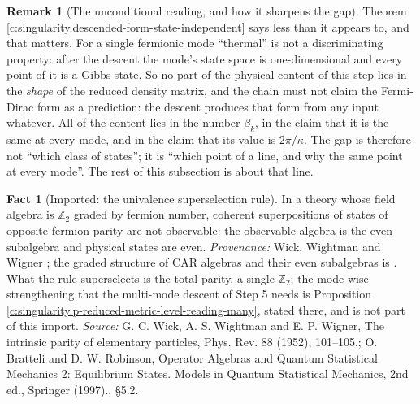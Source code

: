 \documentclass[11pt]{article}
\theoremstyle{definition}
\newtheorem{fact}[theorem]{Fact}
\newtheorem{remark}[theorem]{Remark}
\theoremstyle{plain}
\begin{document}
\begin{remark}[The unconditional reading, and how it sharpens the gap]\label{c:note.singularity.unconditional-reading-how-it-sharpens-gap}
Theorem \ref{c:singularity.descended-form-state-independent} says less than it appears to, and that matters. For a single fermionic mode ``thermal'' is not a discriminating property: after the descent the mode's state space is one-dimensional and every point of it is a Gibbs state. So no part of the physical content of this step lies in the \emph{shape} of the reduced density matrix, and the chain must not claim the Fermi-Dirac form as a prediction: the descent produces that form from any input whatever. All of the content lies in the number $\beta_k$, in the claim that it is the same at every mode, and in the claim that its value is $2\pi/\kappa$. The gap is therefore not ``which class of states''; it is ``which point of a line, and why the same point at every mode''. The rest of this subsection is about that line.
\end{remark}

\begin{fact}[Imported: the univalence superselection rule]\label{c:singularity.imported-univalence-superselection-rule}
In a theory whose field algebra is $\mathbb{Z}_2$ graded by fermion number, coherent superpositions of states of opposite fermion parity are not observable: the observable algebra is the even subalgebra and physical states are even. \emph{Provenance:} Wick, Wightman and Wigner \cite{WWW1952}; the graded structure of CAR algebras and their even subalgebras is \cite[\S 5.2]{BR2}. What the rule superselects is the total parity, a single $\mathbb{Z}_2$; the mode-wise strengthening that the multi-mode descent of Step 5 needs is Proposition \ref{c:singularity.p-reduced-metric-level-reading-many}, stated there, and is not part of this import.
\emph{Source:} G. C. Wick, A. S. Wightman and E. P. Wigner, The intrinsic parity of elementary particles, Phys. Rev. 88 (1952), 101--105.; O. Bratteli and D. W. Robinson, Operator Algebras and Quantum Statistical Mechanics 2: Equilibrium States. Models in Quantum Statistical Mechanics, 2nd ed., Springer (1997)., \S 5.2.
\end{fact}
\end{document}
